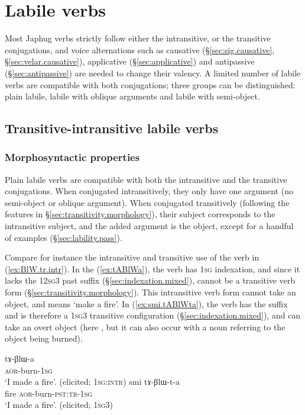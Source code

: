 \section{Labile verbs} \label{sec:lability}
 
Most Japhug verbs strictly follow either the intransitive, or the transitive conjugations, and voice alternations such as causative (§\ref{sec:sig.causative}, §\ref{sec:velar.causative}), applicative (§\ref{sec:applicative}) and antipassive (§\ref{sec:antipassive}) are needed to change their valency. A limited number of labile verbs are compatible with both conjugations; three groups can be distinguished: plain labile, labile with oblique arguments and labile with semi-object.

\subsection{Transitive-intransitive labile verbs} \label{sec:labile.tr-intr}

\subsubsection{Morphosyntactic properties} \label{sec:lability.morphosyntax}
Plain labile verbs are compatible with both the intransitive and the transitive conjugations. When conjugated intransitively, they only have one argument (no semi-object or oblique argument). When conjugated transitively (following the features in §\ref{sec:transitivity.morphology}), their subject corresponds to the intransitive subject, and the added argument is the object, except for a handful of examples (§\ref{sec:lability.pass}).

Compare for instance the intransitive and transitive use of the verb  in (\ref{ex:BlW.tr.intr}). In the (\ref{ex:tABlWa}), the verb has \textsc{1sg} indexation, and since it lacks the 12\textsc{sg}\fl{}3 past  suffix (§\ref{sec:indexation.mixed}), cannot be a transitive verb form (§\ref{sec:transitivity.morphology}). This intransitive verb form cannot take an object, and means `make a fire'. In (\ref{ex:smi.tABlWta}), the verb has the  suffix and is therefore a \textsc{1sg}\fl{}3 transitive configuration (§\ref{sec:indexation.mixed}), and can take an overt object (here , but it can also occur with a noun referring to the object being burned).

\begin{exe}
\ex \label{ex:BlW.tr.intr}
\begin{xlist}
\ex  \label{ex:tABlWa}
\gll tɤ-βlɯ-a  \\
\textsc{aor}-burn-\textsc{1sg} \\
\glt  `I made a fire'. (elicited; \textsc{1sg}:\textsc{intr})
\ex \label{ex:smi.tABlWta}
\gll  smi tɤ-βlɯ-t-a \\
fire \textsc{aor}-burn-\textsc{pst}:\textsc{tr}-\textsc{1sg} \\
\glt  `I made a fire'. (elicited; \textsc{1sg}\fl{}3)
\end{xlist}
\end{exe}

